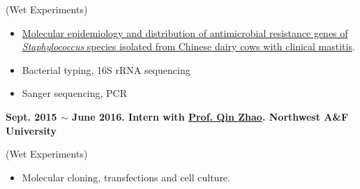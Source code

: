 (Wet Experiments)

\begin{itemize}
    \item \href{https://scholar.google.com/citations?view_op=view_citation&hl=zh-CN&user=ojSVoWQAAAAJ&citation_for_view=ojSVoWQAAAAJ:UeHWp8X0CEIC}
    {Molecular epidemiology and distribution of antimicrobial resistance genes of \textit{Staphylococcus} species isolated from Chinese dairy cows with clinical mastitis}.
    \item Bacterial typing, 16S rRNA sequencing
    \item Sanger sequencing, PCR
\end{itemize}


\textbf{
    Sept. 2015 $\sim$ June 2016. Intern with \href{https://dyxy.nwsuaf.edu.cn/en/People/FullProfessor/5e6012bf013a499c946289472b285795.htm}{Prof. Qin Zhao}. Northwest A\&F University
}

(Wet Experiments)


\begin{itemize}
    \item Molecular cloning, transfections and cell culture.
\end{itemize}